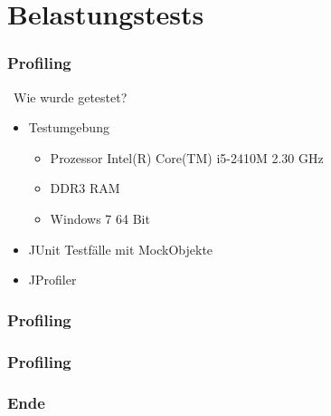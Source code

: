 \documentclass{beamer}
\begin{document}
\section{Belastungstests}
\begin{frame}
  	\frametitle{Profiling}
	\ Wie wurde getestet?
  	\begin{itemize}
		\item Testumgebung
		\begin{itemize}
			\item Prozessor Intel(R) Core(TM) i5-2410M 2.30 GHz
			\item DDR3 RAM
			\item Windows 7 64 Bit
		\end{itemize}
  		\item JUnit Testfälle mit MockObjekte
		\item JProfiler
  	\end{itemize}
\end{frame}
\begin{frame}
	\frametitle{Profiling}
\end{frame}
\begin{frame}
	\frametitle{Profiling}
\end{frame}
\begin{frame}
	\frametitle{Ende}
\end{frame}
\end{document}

